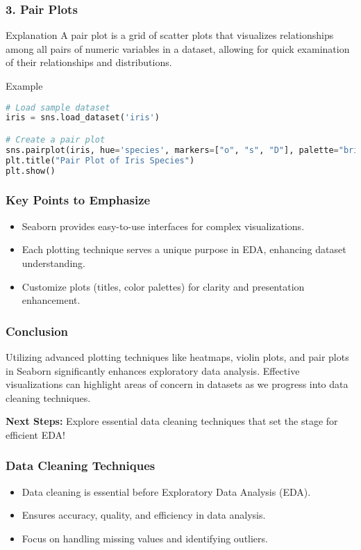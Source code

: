 \documentclass{beamer}
\begin{document}
\begin{frame}[fragile]
    \frametitle{3. Pair Plots}
    \begin{block}{Explanation}
        A pair plot is a grid of scatter plots that visualizes relationships among all pairs of numeric variables in a dataset, allowing for quick examination of their relationships and distributions.
    \end{block}
    \begin{block}{Example}
        \begin{lstlisting}[language=Python]
# Load sample dataset
iris = sns.load_dataset('iris')

# Create a pair plot
sns.pairplot(iris, hue='species', markers=["o", "s", "D"], palette="bright")
plt.title("Pair Plot of Iris Species")
plt.show()
        \end{lstlisting}
    \end{block}
\end{frame}

\begin{frame}[fragile]
    \frametitle{Key Points to Emphasize}
    \begin{itemize}
        \item Seaborn provides easy-to-use interfaces for complex visualizations.
        \item Each plotting technique serves a unique purpose in EDA, enhancing dataset understanding.
        \item Customize plots (titles, color palettes) for clarity and presentation enhancement.
    \end{itemize}
\end{frame}

\begin{frame}[fragile]
    \frametitle{Conclusion}
    Utilizing advanced plotting techniques like heatmaps, violin plots, and pair plots in Seaborn significantly enhances exploratory data analysis. Effective visualizations can highlight areas of concern in datasets as we progress into data cleaning techniques.
    
    \textbf{Next Steps:} Explore essential data cleaning techniques that set the stage for efficient EDA!
\end{frame}

\begin{frame}
    \frametitle{Data Cleaning Techniques}
    \begin{itemize}
        \item Data cleaning is essential before Exploratory Data Analysis (EDA).
        \item Ensures accuracy, quality, and efficiency in data analysis.
        \item Focus on handling missing values and identifying outliers.
    \end{itemize}
\end{frame}
\end{document}
